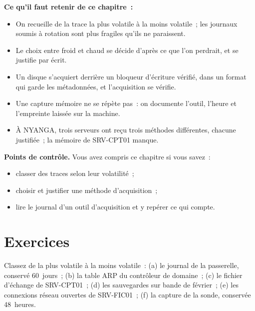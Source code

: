 \separateur

\begin{boxresume}
\textbf{Ce qu'il faut retenir de ce chapitre~:}
\begin{itemize}
    \item On recueille de la trace la plus volatile à la moins volatile~;
          les journaux soumis à rotation sont plus fragiles qu'ils ne
          paraissent.
    \item Le choix entre froid et chaud se décide d'après ce que l'on
          perdrait, et se justifie par écrit.
    \item Un disque s'acquiert derrière un bloqueur d'écriture vérifié,
          dans un format qui garde les métadonnées, et l'acquisition se
          vérifie.
    \item Une capture mémoire ne se répète pas~: on documente l'outil,
          l'heure et l'empreinte laissée sur la machine.
    \item À NYANGA, trois serveurs ont reçu trois méthodes différentes,
          chacune justifiée~; la mémoire de SRV-CPT01 manque.
\end{itemize}
\end{boxresume}

\begin{boxinfo}
\textbf{Points de contrôle.} Vous avez compris ce chapitre si vous savez~:
\begin{itemize}
    \item classer des traces selon leur volatilité~;
    \item choisir et justifier une méthode d'acquisition~;
    \item lire le journal d'un outil d'acquisition et y repérer ce qui
          compte.
\end{itemize}
\end{boxinfo}

\section*{Exercices}

\begin{boxexo}[title={\ding{45}\quad Exercice~3.1. Classer par volatilité \niveaubase}]
Classez de la plus volatile à la moins volatile~: (a) le journal de la
passerelle, conservé 60~jours~; (b) la table ARP du contrôleur de domaine~;
(c) le fichier d'échange de SRV-CPT01~; (d) les sauvegardes sur bande de
février~; (e) les connexions réseau ouvertes de SRV-FIC01~; (f) la capture
de la sonde, conservée 48~heures.
\end{boxexo}

